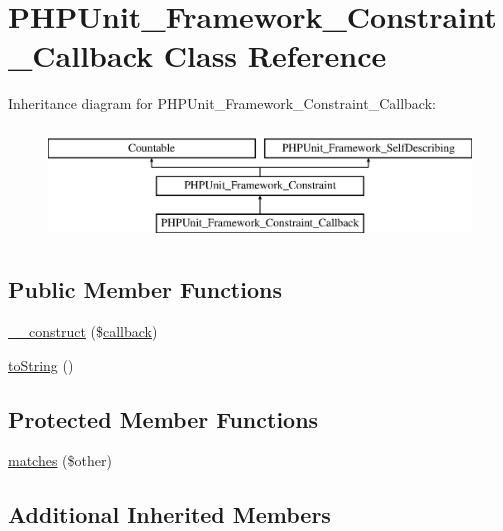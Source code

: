 \hypertarget{class_p_h_p_unit___framework___constraint___callback}{}\section{P\+H\+P\+Unit\+\_\+\+Framework\+\_\+\+Constraint\+\_\+\+Callback Class Reference}
\label{class_p_h_p_unit___framework___constraint___callback}
Inheritance diagram for P\+H\+P\+Unit\+\_\+\+Framework\+\_\+\+Constraint\+\_\+\+Callback\+:\begin{figure}[H]
\begin{center}
\leavevmode
\includegraphics[height=3.000000cm]{class_p_h_p_unit___framework___constraint___callback}
\end{center}
\end{figure}
\subsection*{Public Member Functions}
\begin{DoxyCompactItemize}
\item 
\mbox{\hyperlink{class_p_h_p_unit___framework___constraint___callback_aae70a2214e4c3d274a97b54e983b5fdf}{\+\_\+\+\_\+construct}} (\$\mbox{\hyperlink{_functions_8php_ae2242eb47799ca6a822b022dc1bd1ac9}{callback}})
\item 
\mbox{\hyperlink{class_p_h_p_unit___framework___constraint___callback_a5558c5d549f41597377fa1ea8a1cefa3}{to\+String}} ()
\end{DoxyCompactItemize}
\subsection*{Protected Member Functions}
\begin{DoxyCompactItemize}
\item 
\mbox{\hyperlink{class_p_h_p_unit___framework___constraint___callback_a9c9c337de483bbdbb9fa249a6c7c9cc5}{matches}} (\$other)
\end{DoxyCompactItemize}
\subsection*{Additional Inherited Members}


